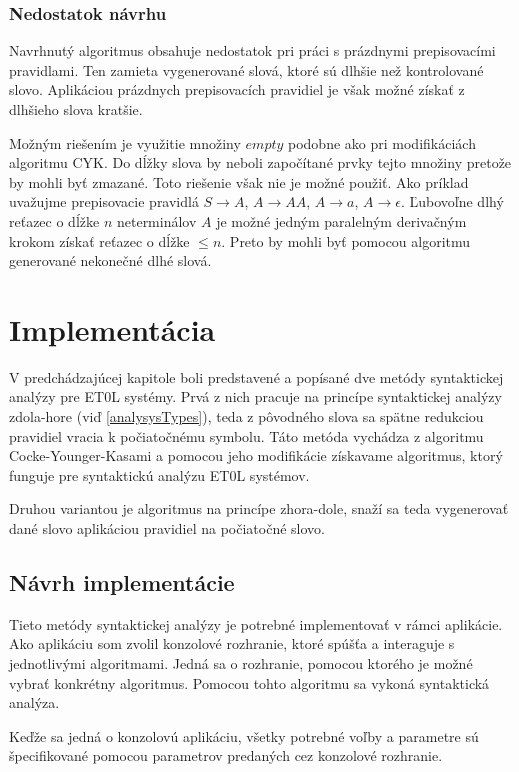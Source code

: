 \subsection*{Nedostatok návrhu}
Navrhnutý algoritmus obsahuje nedostatok pri práci s prázdnymi prepisovacími pravidlami. Ten zamieta vygenerované slová, ktoré sú dlhšie než kontrolované slovo. Aplikáciou prázdnych prepisovacích pravidiel je však možné získať 
z dlhšieho slova kratšie.

Možným riešením je využitie množiny $empty$ podobne ako pri modifikáciách algoritmu CYK. Do dĺžky slova by neboli započítané prvky tejto množiny pretože by mohli byť zmazané. Toto riešenie však nie je možné použiť. Ako príklad uvažujme prepisovacie pravidlá $S \to A$, $A \to AA$, $A \to a$, $A \to \epsilon$. Ľubovoľne dlhý reťazec o dĺžke $n$ neterminálov $A$ je možné jedným paralelným derivačným krokom získať reťazec o dĺžke $\leq n$. Preto by mohli byť pomocou algoritmu generované nekonečné dlhé slová.

\chapter{Implementácia}
\label{implementation}

V predchádzajúcej kapitole boli predstavené a popísané dve metódy syntaktickej analýzy pre ET0L systémy. Prvá z nich pracuje na princípe syntaktickej analýzy zdola-hore (viď \ref{analysysTypes}), teda z pôvodného slova sa spätne redukciou pravidiel vracia k počiatočnému symbolu. Táto metóda vychádza z algoritmu Cocke-Younger-Kasami a pomocou jeho modifikácie získavame algoritmus, ktorý funguje pre syntaktickú analýzu ET0L systémov.

Druhou variantou je algoritmus na princípe zhora-dole, snaží sa teda vygenerovať dané slovo aplikáciou pravidiel na počiatočné slovo.

\section{Návrh implementácie}
Tieto metódy syntaktickej analýzy je potrebné implementovať v rámci aplikácie. Ako aplikáciu som zvolil konzolové rozhranie, ktoré spúšťa a interaguje s jednotlivými algoritmami. Jedná sa o rozhranie, pomocou ktorého je možné vybrať konkrétny algoritmus. Pomocou tohto algoritmu sa vykoná syntaktická analýza.

Keďže sa jedná o konzolovú aplikáciu, všetky potrebné voľby a parametre sú špecifikované pomocou parametrov predaných cez konzolové rozhranie.

